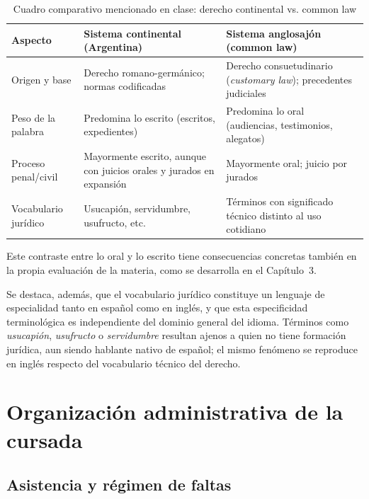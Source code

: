 \documentclass[12pt,oneside]{book}
\begin{document}
\begin{table}[H]
\centering
\caption{Cuadro comparativo mencionado en clase: derecho continental vs. common law}
\begin{tabularx}{\textwidth}{>{\raggedright\arraybackslash}p{} >{\raggedright\arraybackslash}X >{\raggedright\arraybackslash}X}
\toprule
\textbf{Aspecto} & \textbf{Sistema continental (Argentina)} & \textbf{Sistema anglosajón (common law)} \\
\midrule
Origen y base & Derecho romano-germánico; normas codificadas & Derecho consuetudinario (\textit{customary law}); precedentes judiciales \\
Peso de la palabra & Predomina lo escrito (escritos, expedientes) & Predomina lo oral (audiencias, testimonios, alegatos) \\
Proceso penal/civil & Mayormente escrito, aunque con juicios orales y jurados en expansión & Mayormente oral; juicio por jurados \\
Vocabulario jurídico & Usucapión, servidumbre, usufructo, etc. & Términos con significado técnico distinto al uso cotidiano \\
\bottomrule
\end{tabularx}
\end{table}

Este contraste entre lo oral y lo escrito tiene consecuencias concretas también en la propia evaluación de la materia, como se desarrolla en el Capítulo~3.

Se destaca, además, que el vocabulario jurídico constituye un lenguaje de especialidad tanto en español como en inglés, y que esta especificidad terminológica es independiente del dominio general del idioma. Términos como \textit{usucapión}, \textit{usufructo} o \textit{servidumbre} resultan ajenos a quien no tiene formación jurídica, aun siendo hablante nativo de español; el mismo fenómeno se reproduce en inglés respecto del vocabulario técnico del derecho.

\chapter{Organización administrativa de la cursada}

\section{Asistencia y régimen de faltas}
\end{document}
